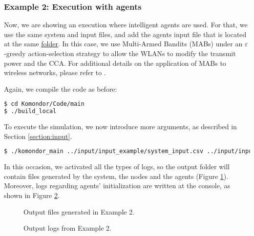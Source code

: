 \documentclass[a4paper]{article}
\begin{document}
\subsubsection{Example 2: Execution with agents}
Now, we are showing an execution where intelligent agents are used. For that, we use the same system and input files, and add the agents input file that is located at the same \href{https://github.com/wn-upf/Komondor/tree/master/Code/input/input_example}{folder}. In this case, we use Multi-Armed Bandits (MABs) under an $\varepsilon$-greedy action-selection strategy to allow the WLANs to modify the transmit power and the CCA. For additional details on the application of MABs to wireless networks, please refer to \cite{wilhelmi2017collaborative, wilhelmi2018potential}.

Again, we compile the code as before:
\begin{lstlisting}[language=bash]
$ cd Komondor/Code/main
$ ./build_local
\end{lstlisting}

To execute the simulation, we now introduce more arguments, as described in Section \ref{section:input}.
\begin{lstlisting}[language=bash]
$ ./komondor_main ../input/input_example/system_input.csv ../input/input_example/nodes_input.csv ../input/input_example/agents.csv 1 1 1 1 1 1 120 432
\end{lstlisting}

In this occasion, we activated all the types of logs, so the output folder will contain files generated by the system, the nodes and the agents (Figure \ref{fig:output_folder}). Moreover, logs regarding agents' initialization are written at the console, as shown in Figure \ref{fig:example_2_console_output}.

\begin{figure}[h!]
	\centering
	\caption{Output files generated in Example 2.}
	\label{fig:output_folder}
\end{figure}

\begin{figure}[h!]
	\centering
	\caption{Output logs from Example 2.}
	\label{fig:example_2_console_output}
\end{figure}

\newpage


\end{document}
